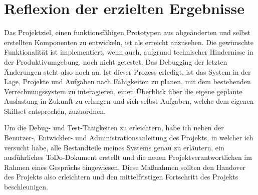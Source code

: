 \section{Reflexion der erzielten Ergebnisse}
\label{sec:reflErg}

Das Projektziel, einen funktionsfähigen Prototypen aus abgeänderten und selbst erstellten Komponenten zu entwickeln, ist als erreicht anzusehen. Die gewünschte Funktionalität ist implementiert, wenn auch, aufgrund technischer Hindernisse in der Produktivumgebung, noch nicht getestet. Das Debugging der letzten Änderungen steht also noch an. Ist dieser Prozess erledigt, ist das System in der Lage, Projekte und Aufgaben nach Fähigkeiten zu planen, mit dem bestehenden Verrechnungssystem zu interagieren, einen Überblick über die eigene geplante Auslastung in Zukunft zu erlangen und sich selbst Aufgaben, welche dem eigenen Skillset entsprechen, zuzuordnen.

Um die Debug- und Test-Tätigkeiten zu erleichtern, habe ich neben der Benutzer-, Entwickler- und Administrationsanleitung des Projekts, in welcher ich versucht habe, alle Bestandteile meines Systems genau zu erläutern, ein ausführliches ToDo-Dokument erstellt und die neuen Projektverantwortlichen im Rahmen eines Gesprächs eingewiesen. Diese Maßnahmen sollten den Handover des Projekts also erleichtern und den mittelfristigen Fortschritt des Projekts beschleunigen.